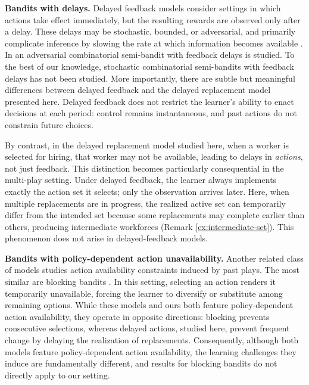 \documentclass[opre,blindrev]{informs3}
\begin{document}
{\bf Bandits with delays.}
Delayed feedback models consider settings in which actions take effect immediately, but the resulting rewards are observed only after a delay. These delays may be stochastic, bounded, or adversarial, and primarily complicate inference by slowing the rate at which information becomes available \cite{joulani2013online}. In \cite{van2023unified} an adversarial combinatorial semi-bandit with feedback delays is studied. To the best of our knowledge, stochastic combinatorial semi-bandits with feedback delays has not been studied. More importantly, there are subtle but meaningful differences between delayed feedback and the delayed replacement model presented here. Delayed feedback does not restrict the learner’s ability to enact decisions at each period: control remains instantaneous, and past actions do not constrain future choices.

By contrast, in the delayed replacement model studied here, when a worker is selected for hiring, that worker may not be available, leading to delays in \emph{actions}, not just feedback. This distinction becomes particularly consequential in the multi-play setting. Under delayed feedback, the learner always implements exactly the action set it selects; only the observation arrives later. Here, when multiple replacements are in progress, the realized active set can temporarily differ from the intended set because some replacements may complete earlier than others, producing intermediate workforces (Remark \ref{ex:intermediate-set}). This phenomenon does not arise in delayed-feedback models.

{\bf Bandits with policy-dependent action unavailability.}
Another related class of models studies action availability constraints induced by past plays. The most similar are blocking bandits \citep{basu2019blocking, atsidakou2021combinatorial}. In this setting, selecting an action renders it temporarily unavailable, forcing the learner to diversify or substitute among remaining options. While these models and ours both feature policy-dependent action availability, they operate in opposite directions: blocking prevents consecutive selections, whereas delayed actions, studied here, prevent frequent change by delaying the realization of replacements. Consequently, although both models feature policy-dependent action availability, the learning challenges they induce are fundamentally different, and results for blocking bandits do not directly apply to our setting.
\end{document}
